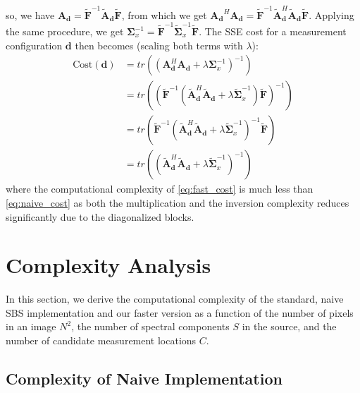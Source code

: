 \documentclass{article}
\begin{document}
so, we have $\bm{A_d} = \widetilde{\bm F}^{-1} \widetilde{\bm A}_{\bm d}
\widetilde{\bm F}$, from which we get $\bm{A_d}^H \bm{A_d} = \widetilde{\bm
F}^{-1} \widetilde{\bm A}_{\bm d}^H \widetilde{\bm A}_{\bm d} \widetilde{\bm
F}$. Applying the same procedure, we get $\bm \Sigma_x^{-1} =
\widetilde{\bm F}^{-1} \widetilde{\bm \Sigma}_x^{-1} \widetilde{\bm F}$.
The SSE cost for a measurement configuration $\bm d$ then becomes (scaling both terms
with $\lambda$):
\begin{align}
\text{Cost}(\bm{d}) & = tr\left(\left( {\bm A}_{\bm d}^H {\bm A}_{\bm d} +
\lambda \bm \Sigma_x^{-1} \right)^{-1} \right)
\label{eq:naive_cost}\\
& = tr\left(\left(\widetilde{\bm F}^{-1} \left( \widetilde{\bm A}_{\bm d}^H
\widetilde{\bm A}_{\bm d} + \lambda \widetilde{\bm \Sigma}_x^{-1} \right)
\widetilde{\bm F}\right)^{-1}\right) \nonumber \\
& = tr\left(\widetilde{\bm F}^{-1} \left( \widetilde{\bm A}_{\bm d}^H
\widetilde{\bm A}_{\bm d} + \lambda \widetilde{\bm \Sigma}_x^{-1} \right)^{-1}
\widetilde{\bm F}\right) \nonumber \\
& = tr\left(\left( \widetilde{\bm A}_{\bm d}^H \widetilde{\bm A}_{\bm d} +
\lambda \widetilde{\bm \Sigma}_x^{-1} \right)^{-1} \right)
\label{eq:fast_cost}
\end{align}
where the computational complexity of \eqref{eq:fast_cost} is much less than
\eqref{eq:naive_cost} as both the multiplication and the inversion complexity
reduces significantly due to the diagonalized blocks.

\section{Complexity Analysis}

In this section, we derive the computational complexity of the standard, naive
SBS implementation and our faster version as a function of the number of pixels
in an image $N^2$, the number of spectral components $S$ in the source, and the
number of candidate measurement locations $C$.

\subsection{Complexity of Naive Implementation}
\end{document}
